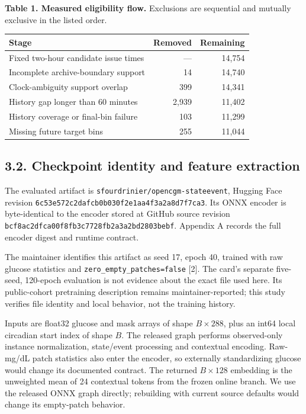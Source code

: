 \documentclass[11pt,letterpaper]{article}
\newcounter{none}
\begin{document}
\textbf{Table 1. Measured eligibility flow.} Exclusions are sequential
and mutually exclusive in the listed order.

{\def\LTcaptype{none} %
\begin{longtable}[]{@{}lrr@{}}
\toprule\noalign{}
Stage & Removed & Remaining \\
\midrule\noalign{}
\endhead
\bottomrule\noalign{}
\endlastfoot
Fixed two-hour candidate issue times & --- & 14,754 \\
Incomplete archive-boundary support & 14 & 14,740 \\
Clock-ambiguity support overlap & 399 & 14,341 \\
History gap longer than 60 minutes & 2,939 & 11,402 \\
History coverage or final-bin failure & 103 & 11,299 \\
Missing future target bins & 255 & 11,044 \\
\end{longtable}
}

\subsection{3.2. Checkpoint identity and feature
extraction}\label{checkpoint-identity-and-feature-extraction}

The evaluated artifact is {\ttfamily\nolinkurl{sfourdrinier/opencgm-stateevent}},
Hugging Face revision {\ttfamily\nolinkurl{6c53e572c2dafcb0b030f2e1aa4f3a2a8d7f7ca3}}.
Its ONNX encoder is byte-identical to the encoder stored at GitHub
source revision {\ttfamily\nolinkurl{bcf8ac2dfca00f8fb3c7728fb2a3a2bd2803bebf}}.
Appendix A records the full encoder digest and runtime contract.

The maintainer identifies this artifact as seed 17, epoch 40, trained
with raw glucose statistics and {\ttfamily\nolinkurl{zero_empty_patches=false}}
{[}2{]}. The card's separate five-seed, 120-epoch evaluation is not
evidence about the exact file used here. Its public-cohort pretraining
description remains maintainer-reported; this study verifies file
identity and local behavior, not the training history.

Inputs are float32 glucose and mask arrays of shape \(B\times288\), plus
an int64 local circadian start index of shape \(B\). The released graph
performs observed-only instance normalization, state/event processing
and contextual encoding. Raw-mg/dL patch statistics also enter the
encoder, so externally standardizing glucose would change its documented
contract. The returned \(B\times128\) embedding is the unweighted mean
of 24 contextual tokens from the frozen online branch. We use the
released ONNX graph directly; rebuilding with current source defaults
would change its empty-patch behavior.
\end{document}

